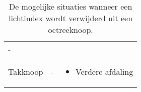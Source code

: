 \begin{table}[tbp]
\begin{tabularx}{\textwidth}{XXX}
    \vspace*{-16pt}
     \vspace{8pt} - \\\vspace*{-16pt}
      
    \vspace{8pt} Takknoop &
      
      \vspace*{-16pt}\vspace{8pt}- &

      \vspace*{-16pt}
      {\scriptsize
      \begin{itemize}
      \item Verdere afdaling
      \end{itemize}}\\ \bottomrule
  \end{tabularx}
  \caption{De mogelijke situaties wanneer een lichtindex wordt verwijderd uit een octreeknoop.}
  \label{tbl:dl-operaties:remove}

\end{table}
